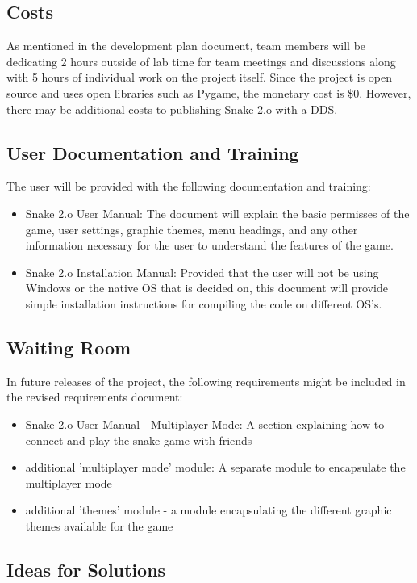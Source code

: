 \documentclass[12pt, titlepage]{article}
\begin{document}
\subsection{Costs}
As mentioned in the development plan document, team members will be dedicating 2 hours outside of lab time for team meetings and discussions along with 5 hours of individual work on the project itself. Since the project is open source and uses open libraries such as Pygame, the monetary cost is \$0. However, there may be additional costs to publishing Snake 2.o with a DDS.

\subsection{User Documentation and Training}

The user will be provided with the following documentation and training:
\begin{itemize}
\item Snake 2.o User Manual: The document will explain the basic permisses of the game, user settings, graphic themes, menu headings, and any other information necessary for the user to understand the features of the game.
\item Snake 2.o Installation Manual: Provided that the user will not be using Windows or the native OS that is decided on, this document will provide simple installation instructions for compiling the code on different OS's.
\end{itemize}

\subsection{Waiting Room}
In future releases of the project, the following requirements might be included in the revised requirements document:
\begin{itemize}
\item Snake 2.o User Manual - Multiplayer Mode: A section explaining how to connect and play the snake game with friends
\item additional 'multiplayer mode' module: A separate module to encapsulate the multiplayer mode
\item additional 'themes' module - a module encapsulating the different graphic themes available for the game
\end{itemize}


\subsection{Ideas for Solutions}
\end{document}
